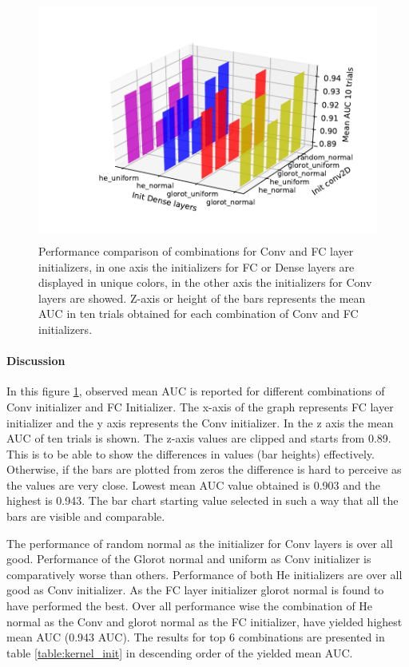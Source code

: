 \begin{figure}[ht]
\centering
\includegraphics[height= 8cm]{images/contrastive/3DbarGraph}
\caption[Performance comparison of different combinations of Conv and FC initializers]{Performance comparison of combinations for Conv and FC layer initializers, in one axis the initializers for FC or Dense layers are displayed in unique colors, in the other axis the initializers for Conv layers are showed. Z-axis or 
height of the bars represents the mean AUC in ten trials obtained for each combination of Conv and FC initializers.}
\label{fig:3DbarGraph_initialization}
\end{figure}

\paragraph{Discussion\\}
In this figure \ref{fig:3DbarGraph_initialization}, observed mean AUC is reported for different combinations of Conv initializer and FC Initializer. The x-axis of the graph represents FC layer initializer 
and the y axis represents the Conv initializer. In the z axis the mean AUC of ten trials is shown. The z-axis values are clipped and starts from 0.89. This is 
to be able to show the differences in values (bar heights) effectively. Otherwise, if the bars are plotted from zeros the difference is hard to perceive as the values are very close.
Lowest mean AUC value obtained is 0.903 and the highest is 0.943. The bar chart starting value selected in such a way that all the bars are visible and comparable.

The performance of random normal as the initializer for Conv layers is over all good. Performance of the Glorot normal and uniform as Conv initializer is comparatively worse than others.
Performance of both He initializers are over all good as Conv initializer. 
As the FC layer initializer glorot normal is found to have performed the best.
Over all performance wise the combination of He normal as the Conv and glorot normal as the FC initializer, have yielded highest mean AUC (0.943 AUC). The results for top 6 combinations are presented in table \ref{table:kernel_init} in descending
order of the yielded mean AUC. 

